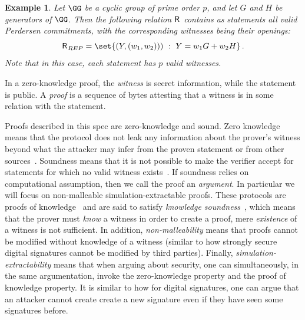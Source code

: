 \documentclass[11pt]{article}
\newtheorem{example}{Example}
\begin{document}
\begin{example}
  Let $\GG$ be a cyclic group of prime order $p$, and let $G$ and $H$ be generators of $\GG$.
	Then the following relation ${\mathsf{R}_{\operatorname{{}}}}$ contains as statements all valid Perdersen commitments, with the corresponding witnesses being their openings:
  $$
	  \relation_{REP} = \set{\left(Y,(w_1,w_2))\right)~:~Y=w_1G + w_2H}\,.
	$$
	Note that in this case, each statement has $p$ valid witnesses.
\end{example}

In a zero-knowledge proof, the \emph{witness} is secret information, while the statement is public.
A \emph{proof} is a sequence of bytes attesting that a witness is in some relation with the statement.

Proofs described in this spec are zero-knowledge and sound.
Zero knowledge means that the protocol does not leak any information about the prover's witness beyond what the attacker may infer from the proven statement or from other sources~\cite[1.6.4]{zkproof-reference}.
Soundness means that it is not possible to make the verifier accept for statements for which no valid witness exists~\cite[1.6.2]{zkproof-reference}.
If soundness relies on computational assumption, then we call the proof an \emph{argument}.
In particular we will focus on non-malleable simulation-extractable proofs.
These protocols are proofs of knowledge~\cite{STOC:GolMicRac85,STOC:FeiFiaSha87,C:BelGol92} and are said to satisfy \emph{knowledge soundness}~\cite{damgard04}, which means that the prover must \emph{know} a witness in order to create a proof, mere \emph{existence} of a witness is not sufficient. 
In addition, \emph{non-malleability} means that proofs cannot be modified without knowledge of a witness (similar to how strongly secure digital signatures cannot be modified by third parties). 
Finally, \emph{simulation-extractability} means that when arguing about security, one can simultaneously, in the same argumentation, invoke the zero-knowledge property and the proof of knowledge property. 
It is similar to how for digital signatures, one can argue that an attacker cannot create create a new signature even if they have seen some signatures before. 
\end{document}
